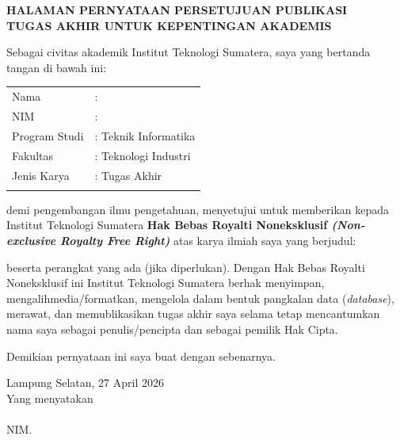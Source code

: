 \clearpage
\pagestyle{fancy}
\fancyhf{}
\fancyhead[R]{\thepage}
%

\begin{center}
	\smallskip
	
	\normalsize \bfseries \MakeUppercase{
		HALAMAN PERNYATAAN PERSETUJUAN PUBLIKASI \\
		TUGAS AKHIR UNTUK KEPENTINGAN AKADEMIS
	}\linebreak
	
	\normalfont \onehalfspacing \justifying
	Sebagai civitas akademik Institut Teknologi Sumatera, saya yang bertanda tangan di bawah ini:
	\\
	\flushleft
	\setlength{\tabcolsep}{0pt}
	\begin{tabular}{l l}
		Nama 			&  : \theauthor\\
		NIM 			&  : \printnim\\
		Program Studi 	&  : Teknik Informatika\\
		Fakultas 		&  : Teknologi Industri\\
		Jenis Karya 	&  : Tugas Akhir\\ \\
	\end{tabular}
	
	\justifying
	\noindent demi pengembangan ilmu pengetahuan, menyetujui untuk memberikan kepada Institut Teknologi Sumatera \textbf{Hak Bebas Royalti Noneksklusif \textit{(Non-exclusive Royalty Free Right)}} atas karya ilmiah saya yang berjudul:
	
	\centering
	\textbf{\thetitle}
	
	{\justifying
	\noindent beserta perangkat yang ada (jika diperlukan). Dengan Hak Bebas Royalti Noneksklusif ini Institut Teknologi Sumatera berhak menyimpan, mengalihmedia/formatkan, mengelola dalam bentuk pangkalan data (\textit{database}), merawat, dan memublikasikan tugas akhir saya selama tetap mencantumkan nama saya sebagai penulis/pencipta dan sebagai pemilik Hak Cipta.

	Demikian pernyataan ini saya buat dengan sebenarnya. \\
	}
	
	\centering
	Lampung Selatan, 27 April 2026\\
	\bigskip
	Yang menyatakan\\
	\vspace{1.5cm}
	\theauthor\\
	NIM. \printnim\\
	
\end{center}
\clearpage
